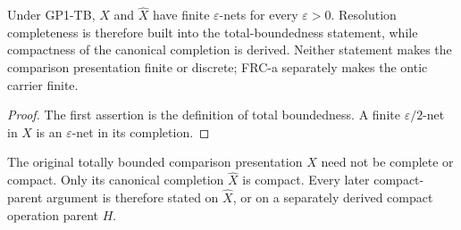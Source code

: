\documentclass[12pt,a4paper]{article}
\begin{document}
\begin{corollary}
\label{p2:cor:gp1-resolution-completeness-derived}
Under GP1-TB, \(X\) and \(\widehat X\) have finite
\(\varepsilon\)-nets for every \(\varepsilon>0\).  Resolution completeness is
therefore built into the total-boundedness statement, while compactness of the
canonical completion is derived.  Neither statement makes the comparison presentation finite
or discrete; FRC-a separately makes the ontic carrier finite.
\end{corollary}

\begin{proof}
The first assertion is the definition of total boundedness.  A finite
\(\varepsilon/2\)-net in \(X\) is an \(\varepsilon\)-net in its completion.
\end{proof}

\begin{remark}
\label{p2:rem:gp1-completion-boundary}
The original totally bounded comparison presentation \(X\) need not be
complete or compact.  Only its canonical completion \(\widehat X\) is compact.
Every later compact-parent argument is therefore stated on \(\widehat X\), or
on a separately derived compact operation parent \(H\).
\end{remark}
\end{document}
